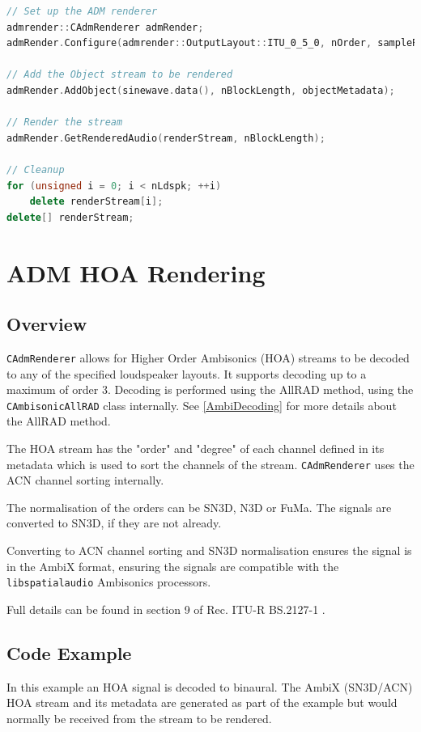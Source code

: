 \documentclass[12pt]{report}
\def\libspataud{\texttt{libspatialaudio}\xspace}
\newcommand{\code}[1]{\texttt{#1}}
\begin{document}
\begin{lstlisting}[language=C++]
// Set up the ADM renderer
admrender::CAdmRenderer admRender;
admRender.Configure(admrender::OutputLayout::ITU_0_5_0, nOrder, sampleRate, nBlockLength, streamInfo);

// Add the Object stream to be rendered
admRender.AddObject(sinewave.data(), nBlockLength, objectMetadata);

// Render the stream
admRender.GetRenderedAudio(renderStream, nBlockLength);

// Cleanup
for (unsigned i = 0; i < nLdspk; ++i)
    delete renderStream[i];
delete[] renderStream;
\end{lstlisting}

\section{ADM HOA Rendering}\label{AdmHOA}

\subsection{Overview}

\code{CAdmRenderer} allows for Higher Order Ambisonics (HOA) streams to be decoded to any of the specified loudspeaker layouts.
It supports decoding up to a maximum of order 3.
Decoding is performed using the AllRAD method, using the \code{CAmbisonicAllRAD} class internally. See \cref{AmbiDecoding} for more details about the AllRAD method.

The HOA stream has the "order" and "degree" of each channel defined in its metadata which is used to sort the channels of the stream.
\code{CAdmRenderer} uses the ACN channel sorting internally.

The normalisation of the orders can be SN3D, N3D or FuMa.
The signals are converted to SN3D, if they are not already.

Converting to ACN channel sorting and SN3D normalisation ensures the signal is in the AmbiX format, ensuring the signals are compatible with the \libspataud Ambisonics processors.

Full details can be found in section 9 of Rec. ITU-R BS.2127-1 \cite{ITU2127}.

\subsection{Code Example}

In this example an HOA signal is decoded to binaural. The AmbiX (SN3D/ACN) HOA stream and its metadata are generated as part of the example but would normally be received from the stream to be rendered.
\end{document}
